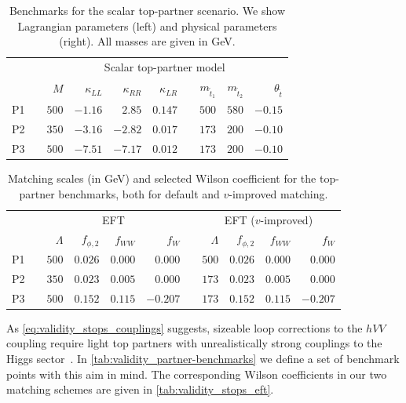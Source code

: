 \begin{table}
\begin{tabular}{c c rrrr c rrr}
  \toprule
  \multirow{2}{*}{}
  && \multicolumn{8}{c}{Scalar top-partner model} \\
  \cmidrule{3-10}
  && $M$ & $\kappa_{LL}$ & $\kappa_{RR}$ & $\kappa_{LR}$
  && $m_{\tilde{t}_{1}}$ & $m_{{\tilde{t}_{2}}}$ & $\theta_{\tilde{t}}$ \\
  \midrule
  P1 && $500$ & $-1.16$ & $2.85$ & $0.147$ && $500$ & $580$ & $-0.15$ \\
  P2 && $350$ & $-3.16$ & $-2.82$ & $0.017$ && $173$ & $200$ & $-0.10$ \\
  P3 && $500$ & $-7.51$ & $-7.17$ & $0.012$ && $173$ & $200$ & $-0.10$ \\
  \bottomrule
 \end{tabular}
 \caption[Benchmarks for the top partners]{Benchmarks for the
   scalar top-partner scenario. We show Lagrangian parameters (left)
   and physical parameters (right). All masses are given in GeV.}
  \label{tab:validity_stops_benchmarks}
\end{table}

\begin{table}
  \begin{tabular}{c c rrrr c rrrr}
    \toprule
    \multirow{2}{*}{}
    && \multicolumn{4}{c}{EFT} && \multicolumn{4}{c}{EFT ($v$-improved)} \\
    \cmidrule{3-6} \cmidrule{8-11}
    && $\Lambda$ & $f_{\phi,2}$ & $f_{WW}$ & $f_W$
    && $\Lambda$ & $f_{\phi,2}$ & $f_{WW}$ & $f_W$ \\
    \midrule
    P1 && $500$ & $0.026$ & $0.000$ & $0.000$ && $500$ & $0.026$ & $0.000$ & $0.000$\\
    P2 && $350$ & $0.023$ & $0.005$ & $0.000$ && $173$ & $0.023$ & $0.005$ & $0.000$ \\
    P3 && $500$ & $0.152$ & $0.115$ & $-0.207$ && $173$ & $0.152$ & $0.115$ & $-0.207$ \\
    \bottomrule
  \end{tabular}
  \caption[EFT description for the top-partner benchmarks]{Matching
    scales (in GeV) and selected Wilson coefficient
    for the top-partner benchmarks, both for default and $v$-improved
    matching.}
  \label{tab:validity_stops_eft}
\end{table}

As \autoref{eq:validity_stops_couplings} suggests, sizeable loop
corrections to the $hVV$ coupling require light top partners with
unrealistically strong couplings to the Higgs
sector~\cite{Hollik:2008xn}. In
\autoref{tab:validity_partner-benchmarks} we define a set of benchmark
points with this aim in mind. The corresponding Wilson coefficients in
our two matching schemes are given in
\autoref{tab:validity_stops_eft}.

